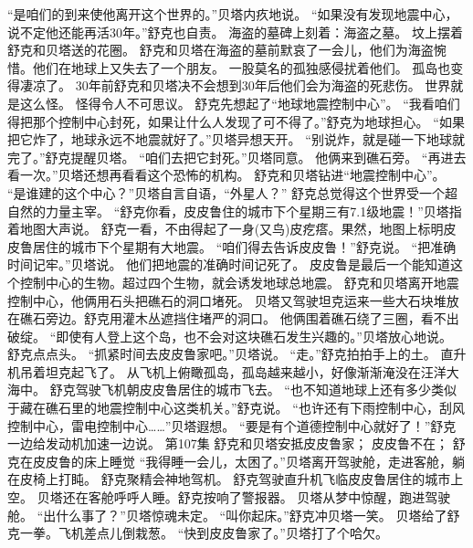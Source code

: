 \documentclass[a4paper,12pt,UTF8,twoside]{ctexbook}
\begin{document}
        “是咱们的到来使他离开这个世界的。”贝塔内疚地说。 
        “如果没有发现地震中心，说不定他还能再活30年。”舒克也自责。 
        海盗的墓碑上刻着：海盗之墓。 
        坟上摆着舒克和贝塔送的花圈。 
        舒克和贝塔在海盗的墓前默哀了一会儿，他们为海盗惋惜。他们在地球上又失去了一个朋友。 
        一股莫名的孤独感侵扰着他们。 
        孤岛也变得凄凉了。 
        30年前舒克和贝塔决不会想到30年后他们会为海盗的死悲伤。 
        世界就是这么怪。 
        怪得令人不可思议。 
        舒克先想起了“地球地震控制中心”。 
        “我看咱们得把那个控制中心封死，如果让什么人发现了可不得了。”舒克为地球担心。 
        “如果把它炸了，地球永远不地震就好了。”贝塔异想天开。 
        “别说炸，就是碰一下地球就完了。”舒克提醒贝塔。 
        “咱们去把它封死。”贝塔同意。 
        他俩来到礁石旁。 
        “再进去看一次。”贝塔还想再看看这个恐怖的机构。 
        舒克和贝塔钻进“地震控制中心”。 
        “是谁建的这个中心？”贝塔自言自语，“外星人？” 
        舒克总觉得这个世界受一个超自然的力量主宰。 
        “舒克你看，皮皮鲁住的城市下个星期三有7.1级地震！”贝塔指着地图大声说。 
        舒克一看，不由得起了一身(又鸟)皮疙瘩。果然，地图上标明皮皮鲁居住的城市下个星期有大地震。 
        “咱们得去告诉皮皮鲁！”舒克说。 
        “把准确时间记牢。”贝塔说。 
        他们把地震的准确时间记死了。 
        皮皮鲁是最后一个能知道这个控制中心的生物。超过四个生物，就会诱发地球总地震。 
        舒克和贝塔离开地震控制中心，他俩用石头把礁石的洞口堵死。 
        贝塔又驾驶坦克运来一些大石块堆放在礁石旁边。舒克用灌木丛遮挡住堵严的洞口。 
        他俩围着礁石绕了三圈，看不出破绽。 
        “即使有人登上这个岛，也不会对这块礁石发生兴趣的。”贝塔放心地说。 
        舒克点点头。 
        “抓紧时间去皮皮鲁家吧。”贝塔说。 
        “走。”舒克拍拍手上的土。 
        直升机吊着坦克起飞了。 
        从飞机上俯瞰孤岛，孤岛越来越小，好像渐渐淹没在汪洋大海中。 
        舒克驾驶飞机朝皮皮鲁居住的城市飞去。 
        “也不知道地球上还有多少类似于藏在礁石里的地震控制中心这类机关。”舒克说。 
        “也许还有下雨控制中心，刮风控制中心，雷电控制中心……”贝塔遐想。 
        “要是有个道德控制中心就好了！”舒克一边给发动机加速一边说。   第107集 
        舒克和贝塔安抵皮皮鲁家； 
        皮皮鲁不在； 
        舒克在皮皮鲁的床上睡觉   
        “我得睡一会儿，太困了。”贝塔离开驾驶舱，走进客舱，躺在皮椅上打盹。 
        舒克聚精会神地驾机。 
        舒克驾驶直升机飞临皮皮鲁居住的城市上空。 
        贝塔还在客舱呼呼人睡。舒克按响了警报器。 
        贝塔从梦中惊醒，跑进驾驶舱。 
        “出什么事了？”贝塔惊魂未定。 
        “叫你起床。”舒克冲贝塔一笑。 
        贝塔给了舒克一拳。飞机差点儿倒栽葱。 
        “快到皮皮鲁家了。”贝塔打了个哈欠。 
\end{document}
